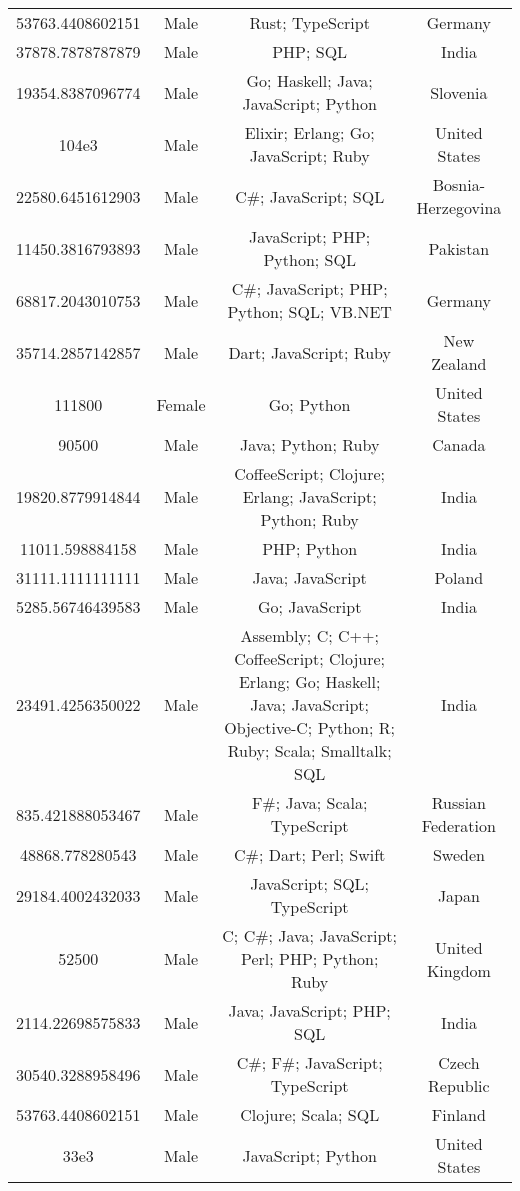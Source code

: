 \begin{center}
\begin{tabular}{ |c|c|c|c| }
53763.4408602151  &  Male  &  Rust; TypeScript  &  Germany  \\ 
37878.7878787879  &  Male  &  PHP; SQL  &  India  \\ 
19354.8387096774  &  Male  &  Go; Haskell; Java; JavaScript; Python  &  Slovenia  \\ 
104e3  &  Male  &  Elixir; Erlang; Go; JavaScript; Ruby  &  United States  \\ 
22580.6451612903  &  Male  &  C\#; JavaScript; SQL  &  Bosnia-Herzegovina  \\ 
11450.3816793893  &  Male  &  JavaScript; PHP; Python; SQL  &  Pakistan  \\ 
68817.2043010753  &  Male  &  C\#; JavaScript; PHP; Python; SQL; VB.NET  &  Germany  \\ 
35714.2857142857  &  Male  &  Dart; JavaScript; Ruby  &  New Zealand  \\ 
111800  &  Female  &  Go; Python  &  United States  \\ 
90500  &  Male  &  Java; Python; Ruby  &  Canada  \\ 
19820.8779914844  &  Male  &  CoffeeScript; Clojure; Erlang; JavaScript; Python; Ruby  &  India  \\ 
11011.598884158  &  Male  &  PHP; Python  &  India  \\ 
31111.1111111111  &  Male  &  Java; JavaScript  &  Poland  \\ 
5285.56746439583  &  Male  &  Go; JavaScript  &  India  \\ 
23491.4256350022  &  Male  &  Assembly; C; C++; CoffeeScript; Clojure; Erlang; Go; Haskell; Java; JavaScript; Objective-C; Python; R; Ruby; Scala; Smalltalk; SQL  &  India  \\ 
835.421888053467  &  Male  &  F\#; Java; Scala; TypeScript  &  Russian Federation  \\ 
48868.778280543  &  Male  &  C\#; Dart; Perl; Swift  &  Sweden  \\ 
29184.4002432033  &  Male  &  JavaScript; SQL; TypeScript  &  Japan  \\ 
52500  &  Male  &  C; C\#; Java; JavaScript; Perl; PHP; Python; Ruby  &  United Kingdom  \\ 
2114.22698575833  &  Male  &  Java; JavaScript; PHP; SQL  &  India  \\ 
30540.3288958496  &  Male  &  C\#; F\#; JavaScript; TypeScript  &  Czech Republic  \\ 
53763.4408602151  &  Male  &  Clojure; Scala; SQL  &  Finland  \\ 
33e3  &  Male  &  JavaScript; Python  &  United States  \\ 

\end{tabular}
\end{center}
